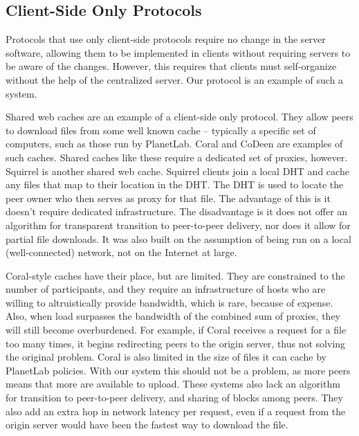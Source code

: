\subsection{Client-Side Only Protocols}
Protocols that use only client-side protocols require no change in the server software, allowing them to be implemented in clients without requiring servers to be aware of the changes.  However, this requires that clients must self-organize without the help of the centralized server.  Our protocol is an example of such a system.

Shared web caches are an example of a client-side only protocol.  They allow peers to download files from some well known cache -- typically a specific set of computers, such as those run by PlanetLab.  Coral \cite{coral} and CoDeen \cite{codeen} are examples of such caches.  Shared caches like these require a dedicated set of proxies, however.  Squirrel \cite{squirrel} is another shared web cache.  Squirrel clients join a local DHT and cache any files that map to their location in the DHT.  The DHT is used to locate the peer owner who then serves as proxy for that file.  The advantage of this is it doesn't require dedicated infrastructure.  The disadvantage is it does not offer an algorithm for transparent transition to peer-to-peer delivery, nor does it allow for partial file downloads.  It was also built on the assumption of being run on a local (well-connected) network, not on the Internet at large.

Coral-style caches have their place, but are limited.  They are constrained to the number of participants, and they require an infrastructure of hosts who are willing to altruistically provide bandwidth, which is rare, because of expense.  Also, when load surpasses the bandwidth of the 
combined sum of proxies, they will still become overburdened.  For example, if Coral receives a request for a file too many times, it begins redirecting peers to the origin server, thus not solving the original problem.  
Coral is also limited in the size of files it can cache by PlanetLab policies.  With our system this should not be a problem, as more peers means that more are available to upload.  These systems also lack an algorithm for transition to peer-to-peer delivery, and sharing of blocks among peers.  They also add an extra hop in network latency per request, even if a request from the origin server would have been the fastest way to download the file.    

